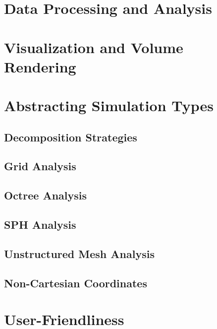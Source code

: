 \documentclass{emulateapj}
\begin{document}
\section{Data Processing and Analysis}


\section{Visualization and Volume Rendering}


\section{Abstracting Simulation Types}


\subsection{Decomposition Strategies}


\subsection{Grid Analysis}


\subsection{Octree Analysis}


\subsection{SPH Analysis}


\subsection{Unstructured Mesh Analysis}


\subsection{Non-Cartesian Coordinates}


\section{User-Friendliness}

\end{document}
